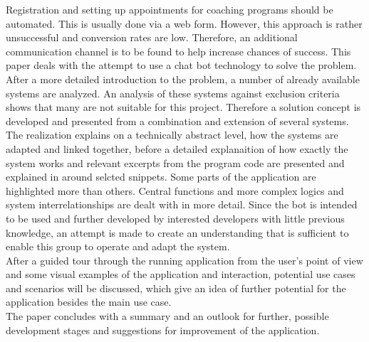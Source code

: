 Registration and setting up appointments for coaching programs should be automated. This is usually done via a web form. However, this approach is rather unsuccessful and conversion rates are low. Therefore, an additional communication channel is to be found to help increase chances of success. This paper deals with the attempt to use a chat bot technology to solve the problem. After a more detailed introduction to the problem, a number of already available systems are analyzed. An analysis of these systems against exclusion criteria shows that many are not suitable for this project. Therefore a solution concept is developed and presented from a combination and extension of several systems. The realization explains on a  technically abstract level, how the systems are adapted and linked together, before a detailed explanaition of how exactly the system works and relevant excerpts from the program code are presented and explained in around selcted snippets. Some parts of the application are highlighted more than others. Central functions and more complex logics and system interrelationships are dealt with in more detail. Since the bot is intended to be used and further developed by interested developers with little previous knowledge, an attempt is made to create an understanding that is sufficient to enable this group to operate and adapt the system. \\
After a guided tour through the running application from the user's point of view and some visual examples of the application and interaction, potential use cases and scenarios will be discussed, which give an idea of further potential for the application besides the main use case. \\
The paper concludes with a summary and an outlook for further, possible development stages and suggestions for improvement of the application.